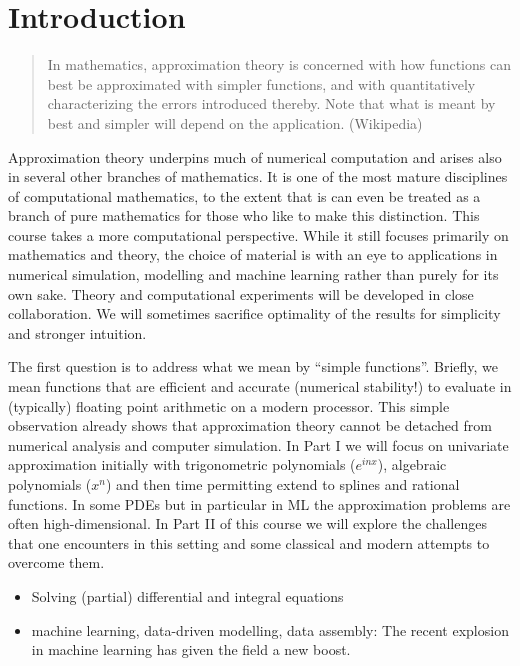
\section{Introduction}
%
\label{sec:intro}
%
\begin{quote}
In mathematics, approximation theory is concerned with how functions can best be
approximated with simpler functions, and with quantitatively characterizing the
errors introduced thereby. Note that what is meant by best and simpler will
depend on the application. (Wikipedia)
\end{quote}

Approximation theory underpins much of numerical computation and arises also  in
several other branches of mathematics. It is one of the most mature disciplines
of computational mathematics, to the extent that is can even be treated as a branch 
of pure mathematics for those who like to make this distinction. This course takes a more computational
perspective. While it still focuses primarily on mathematics and theory, the
choice of material is with an eye to applications in numerical simulation, modelling 
and machine learning rather than purely for its own sake. Theory and computational 
experiments will be developed in close collaboration. 
We will sometimes sacrifice optimality of the results for simplicity and
 stronger intuition.

The first question is to address what we mean by ``simple functions''. Briefly,
we mean functions that are efficient and accurate (numerical stability!) to
evaluate in (typically) floating point arithmetic on a modern processor. This
simple  observation already shows that approximation theory cannot be detached
from numerical analysis and computer simulation. In Part I we will focus on
univariate approximation initially with 
trigonometric polynomials ($e^{i n x}$), algebraic polynomials ($x^n$) and then 
time permitting extend to splines and rational functions. 
In some PDEs but in particular in
ML the approximation problems are often high-dimensional. In Part II of this 
course we will explore the challenges that one encounters in this setting 
and some classical and modern attempts to overcome them.

\bigskip 
{}
\begin{itemize}
  \item Solving (partial) differential and integral equations
  \item machine learning, data-driven modelling, data assembly: The recent
  explosion in machine learning has given the field a new boost.
\end{itemize}


